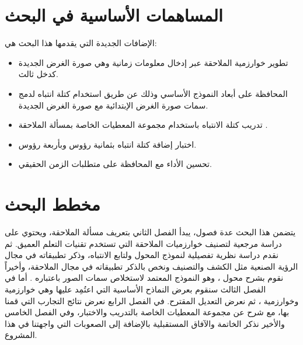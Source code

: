 \section{المساهمات الأساسية في البحث}
الإضافات الجديدة التي يقدمها هذا البحث هي:
\begin{itemize}
\item
تطوير خوارزمية الملاحقة 
عبر إدخال معلومات زمانية وهي صورة الغرض الجديدة كدخل ثالث.
\item
المحافظة على أبعاد النموذج الأساسي وذلك عن طريق استخدام كتلة انتباه لدمج سمات صورة الغرض الإبتدائية مع صورة الغرض الجديدة.
\item
تدريب كتلة الانتباه باستخدام مجموعة المعطيات الخاصة بمسألة الملاحقة
.
\item
اختبار إضافة كتلة انتباه بثمانية رؤوس وبأربعة رؤوس.
\item
تحسين الأداء مع المحافظة على متطلبات الزمن الحقيقي.
\end{itemize}
\section{مخطط البحث}
يتضمن هذا البحث عدة فصول، يبدأ الفصل الثاني بتعريف مسألة الملاحقة، ويحتوي على دراسة مرجعية لتصنيف خوارزميات الملاحقة التي تستخدم تقنيات التعلم العميق. ثم نقدم دراسة نظرية تفصيلية لنموذج المحول ولتابع الانتباه، وذكر تطبيقاته في مجال الرؤية الصنعية مثل الكشف والتصنيف ونخص بالذكر تطبيقاته في مجال الملاحقة، وأخيراً نقوم بشرح محول 
،
وهو النموذج المعتمد لاستخلاص سمات الصور باعتباره
.
\newline
أما في الفصل الثالث سنقوم بعرض النماذح الأساسية التي اعتُمِد عليها وهي خوارزمية 
وخوارزمية
،
ثم نعرض التعديل المقترح.
\newline
في الفصل الرابع نعرض نتائج التجارب التي قمنا بها، مع شرح عن مجموعة المعطيات الخاصة بالتدريب والاختبار،
وفي الفصل الخامس والأخير نذكر الخاتمة والآفاق المستقبلية بالإضافة إلى الصعوبات التي واجهتنا في هذا المشروع.



